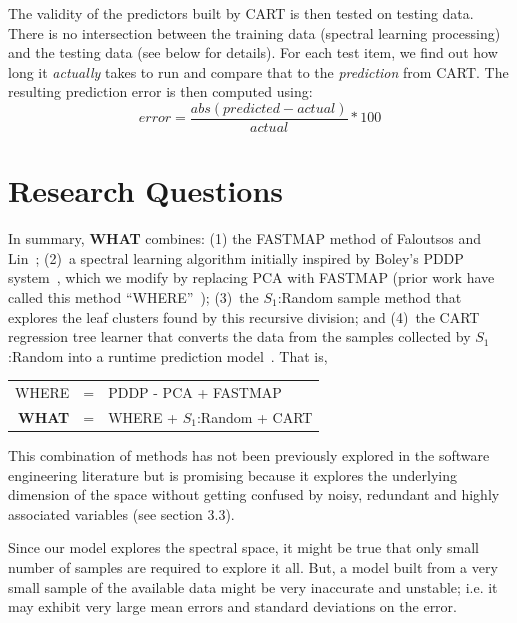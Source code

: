 \documentclass{sig-alternative}
\newcommand{\what}{{\bf WHAT }}
\begin{document}
The validity of the predictors built by CART  is then tested on testing data. There is no intersection between the training data (spectral learning processing) and the testing data (see below for details). For each  test item, we find out how long it {\em actually} takes to run and compare that
to the {\em prediction} from CART. The resulting prediction error is then computed using:
\begin{equation}\label{eq:err}
\mathit{error}=\frac{\mathit{abs}(\mathit{predicted} - \mathit{actual})}{\mathit{actual}}*100
\end{equation}

\section{Research Questions} 
In summary, \what  combines:
(1) the FASTMAP method of Faloutsos and Lin~\cite{Faloutsos1995};
(2)~a spectral learning algorithm initially   inspired by    Boley's PDDP system~\cite{boley98}, which we modify
by replacing  PCA with FASTMAP (prior work have called this
method ``WHERE''~\cite{me12d});
(3)~the $S_1$:Random sample method that explores the leaf clusters found by this recursive division;
and (4)~the CART regression tree learner that converts the data from the samples collected by $S_1$:Random
into a runtime prediction model~\cite{breiman1984}.
That is,
\begin{center}
\begin{tabular}{rcl}
WHERE& = &PDDP - PCA + FASTMAP\\ 
\what& =  & WHERE + $S_1$:Random + CART
\end{tabular}
\end{center}
This combination of methods has not been previously explored in the
software engineering literature but is promising because it explores the underlying dimension of the space without getting confused by noisy, redundant and highly associated variables (see section 3.3).


Since our model explores the spectral space, it might be true that only small
number of samples are required to explore it all.
But, a model built from a very small sample of the available data might
be very inaccurate and unstable; i.e. it may exhibit very large mean errors and standard deviations on the error.
\end{document}
